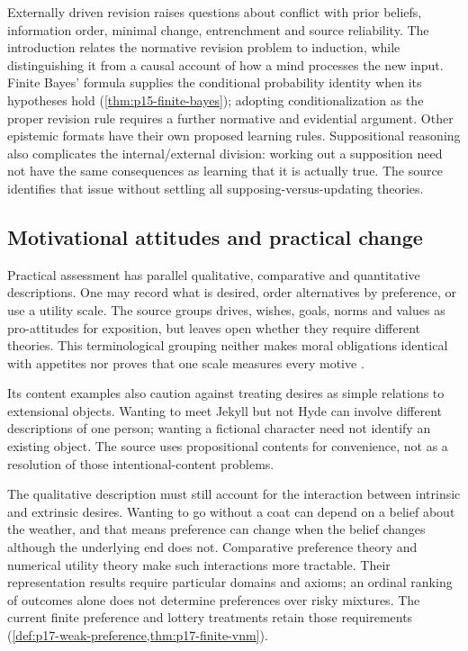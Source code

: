 Externally driven revision raises questions about conflict with prior
beliefs, information order, minimal change, entrenchment and source
reliability. The introduction relates the normative revision problem to
induction, while distinguishing it from a causal account of how a mind
processes the new input. Finite Bayes' formula supplies the conditional
probability identity when its hypotheses hold
(\cref{thm:p15-finite-bayes}); adopting conditionalization as the proper
revision rule requires a further normative and evidential argument.
Other epistemic formats have their own proposed learning rules.
Suppositional reasoning also complicates the internal/external division:
working out a supposition need not have the same consequences as learning
that it is actually true. The source identifies that issue without
settling all supposing-versus-updating theories.

\subsection{Motivational attitudes and practical change}

Practical assessment has parallel qualitative, comparative and
quantitative descriptions. One may record what is desired, order
alternatives by preference, or use a utility scale. The source groups
drives, wishes, goals, norms and values as pro-attitudes for exposition,
but leaves open whether they require different theories. This
terminological grouping neither makes moral obligations identical with
appetites nor proves that one scale measures every motive
\cite[pp.~14--16 and notes~19--21]{KnauffSpohn2021FrameworksIntro}.

Its content examples also caution against treating desires as simple
relations to extensional objects. Wanting to meet Jekyll but not Hyde
can involve different descriptions of one person; wanting a fictional
character need not identify an existing object. The source uses
propositional contents for convenience, not as a resolution of those
intentional-content problems.

The qualitative description must still account for the interaction
between intrinsic and extrinsic desires. Wanting to go without a coat
can depend on a belief about the weather, and that means preference
can change when the belief changes although the underlying end does
not. Comparative preference theory and numerical utility theory make
such interactions more tractable. Their representation results require
particular domains and axioms; an ordinal ranking of outcomes alone
does not determine preferences over risky mixtures. The current finite
preference and lottery treatments retain those requirements
(\cref{def:p17-weak-preference,thm:p17-finite-vnm}).


